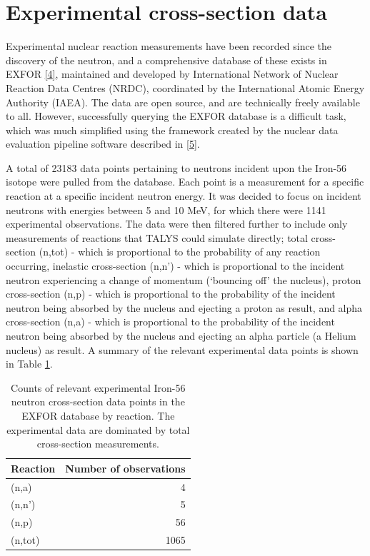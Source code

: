 \documentclass[
  12pt,
  a4paper,
  twoside]{book}
\begin{document}
\hypertarget{Background:data}{%
\section{Experimental cross-section data}\label{Background:data}}

Experimental nuclear reaction measurements have been recorded since the discovery of the neutron, and a comprehensive database of these exists in EXFOR \protect\hyperlink{ref-exfor}{{[}4{]}}, maintained and developed by International Network of Nuclear Reaction Data Centres (NRDC), coordinated by the International Atomic Energy Authority (IAEA). The data are open source, and are technically freely available to all. However, successfully querying the EXFOR database is a difficult task, which was much simplified using the framework created by the nuclear data evaluation pipeline software described in \protect\hyperlink{ref-Schnabel_2021}{{[}5{]}}.

A total of 23183 data points pertaining to neutrons incident upon the Iron-56 isotope were pulled from the database. Each point is a measurement for a specific reaction at a specific incident neutron energy. It was decided to focus on incident neutrons with energies between 5 and 10 MeV, for which there were 1141 experimental observations. The data were then filtered further to include only measurements of reactions that TALYS could simulate directly; total cross-section (n,tot) - which is proportional to the probability of any reaction occurring, inelastic cross-section (n,n') - which is proportional to the incident neutron experiencing a change of momentum (`bouncing off' the nucleus), proton cross-section (n,p) - which is proportional to the probability of the incident neutron being absorbed by the nucleus and ejecting a proton as result, and alpha cross-section (n,a) - which is proportional to the probability of the incident neutron being absorbed by the nucleus and ejecting an alpha particle (a Helium nucleus) as result. A summary of the relevant experimental data points is shown in Table \ref{tab:exp-data-count}.

\begin{table}

\caption{\label{tab:exp-data-count}Counts of relevant experimental Iron-56 neutron cross-section data points in the EXFOR database by reaction. The experimental data are dominated by total cross-section measurements.}
\centering
\begin{tabular}[t]{l|r}
\hline
Reaction & Number of observations\\
\hline
(n,a) & 4\\
\hline
(n,n') & 5\\
\hline
(n,p) & 56\\
\hline
(n,tot) & 1065\\
\hline
\end{tabular}
\end{table}
\end{document}
